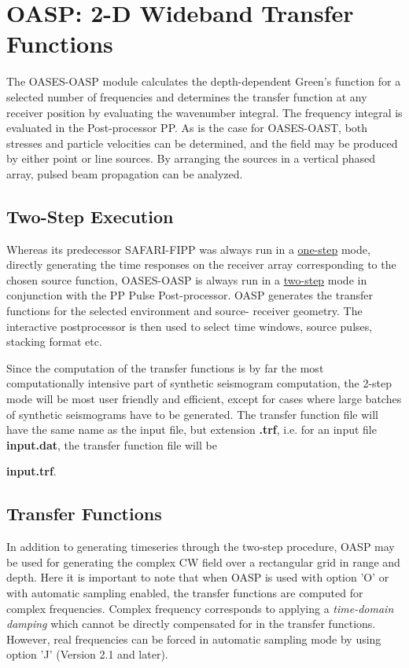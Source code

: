 \section{OASP: 2-D Wideband Transfer Functions}

    The OASES-OASP module calculates the depth-dependent  Green's 
function for a selected number of frequencies and determines  the 
transfer function at any receiver position by evaluating  the 
wavenumber  integral. The frequency integral is evaluated in the
Post-processor PP.  As is  the 
case for OASES-OAST, both stresses and particle velocities can be 
determined, and the field may be produced by either point or line 
sources.  By  arranging the sources in a vertical  phased  array, 
pulsed beam propagation can be analyzed.

\subsection{Two-Step Execution}

    Whereas its predecessor SAFARI-FIPP was always run in a
\underline{one-step} 
mode,  directly generating the time responses on the receiver 
array corresponding to the chosen source function, OASES-OASP 
is always  run in a \underline{two-step} mode in conjunction with  the  PP 
Pulse  Post-processor.  OASP   generates  the 
transfer  functions  for  the selected  environment  and  source-
receiver geometry. The interactive postprocessor is then used  to 
select time windows, source pulses, stacking format etc. 

    Since the computation of the transfer functions is by far the 
most  computationally  intensive  part  of  synthetic  seismogram 
computation,  the  2-step  mode will be most  user  friendly  and 
efficient,  except  for cases where large  batches  of  synthetic 
seismograms have to be generated. The transfer function file will have
the same name as the input file, but extension {\bf .trf}, i.e. for an
input file {\bf input.dat}, the transfer function file will be 

{\bf
input.trf}. 

\subsection{Transfer Functions}

In addition to generating timeseries through the two-step procedure,
OASP may be used for generating the complex CW field over a
rectangular grid in range and depth. Here it is important to note that
when OASP is used with option 'O' or with automatic
sampling enabled, the transfer functions are computed for complex
frequencies. Complex frequency corresponds to applying a {\em
time-domain damping} which cannot be directly compensated for in the
transfer functions. However, real frequencies can be forced in
automatic sampling mode by using option 'J' (Version 2.1 and later).

